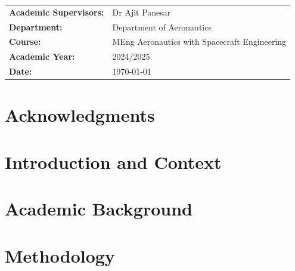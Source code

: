 \documentclass[11pt,a4paper]{report}
\begin{document}
\begin{titlepage}
\begin{center}
        \begin{center}
            \renewcommand{\arraystretch}{1.5}
            \hfill\begin{tabular}{p{} p{}}
            \hfill\textbf{Academic Supervisors:} & Dr Ajit Panesar \\ 
            \hfill\textbf{Department:}           & Department of Aeronautics \\
            \hfill\textbf{Course:}               & MEng Aeronautics with Spacecraft Engineering \\
            \hfill\textbf{Academic Year:}        & 2024/2025 \\
            \hfill\textbf{Date:}                 & \today \\
            \end{tabular}
        \end{center}
            
        
    \end{center}
\end{titlepage}

\begin{abstract}

\end{abstract}

\chapter*{Acknowledgments}


\tableofcontents
\listoffigures
\listoftables

\newpage

\clearpage
{}

\chapter{Introduction and Context}


\chapter{Academic Background}


\chapter{Methodology}

\end{document}

